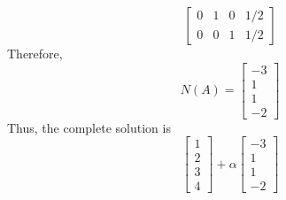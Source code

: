 \begin{enumerate}[label=(\alph*)]
\begin{mdframed}[style=MyFrame]
\begin{equation}
\begin{bmatrix}
                    0       &   1   &   0   &   1/2     \\
                    0       &   0   &   1   &   1/2
                \end{bmatrix}
            \end{equation}
            Therefore,
            \begin{equation}
                N(A) =
                \begin{bmatrix}
                    -3      \\
                    1       \\
                    1       \\
                    -2
                \end{bmatrix}
            \end{equation}
            Thus, the complete solution is
            \begin{equation}
                \begin{bmatrix}
                    1       \\
                    2       \\
                    3       \\
                    4
                \end{bmatrix}
                +
                \alpha
                \begin{bmatrix}
                    -3      \\
                    1       \\
                    1       \\
                    -2
                \end{bmatrix}
            \end{equation}
        \end{mdframed}
\end{enumerate}






                    

